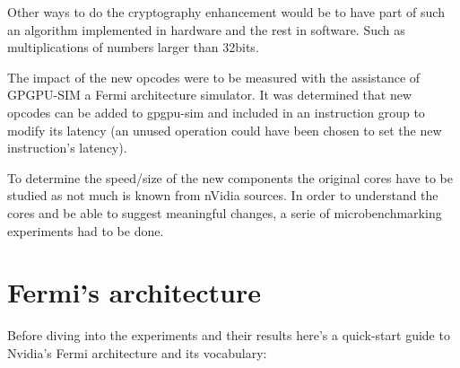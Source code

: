 \documentclass{report}
\begin{document}
    Other ways to do the cryptography enhancement would be to have part of such
    an algorithm implemented in hardware and the rest in software.
    Such as multiplications of numbers larger than 32bits.
    

    The impact of the new opcodes were to be measured with the assistance of
    GPGPU-SIM\cite{gpgpusim09} a Fermi architecture simulator. It was determined
    that new opcodes can be added to gpgpu-sim and included in an instruction group
    to modify its latency (an unused operation could have been chosen to set the new
    instruction's latency).

    To determine the speed/size of the new components the original cores have to
    be studied as not much is known from nVidia sources. In order to understand 
    the cores and be able to suggest meaningful changes, a serie of microbenchmarking 
    experiments had to be done. 


\chapter{Fermi's architecture}
    Before diving into the experiments and their results here's a quick-start
    guide to Nvidia's Fermi architecture and its vocabulary:
\end{document}
